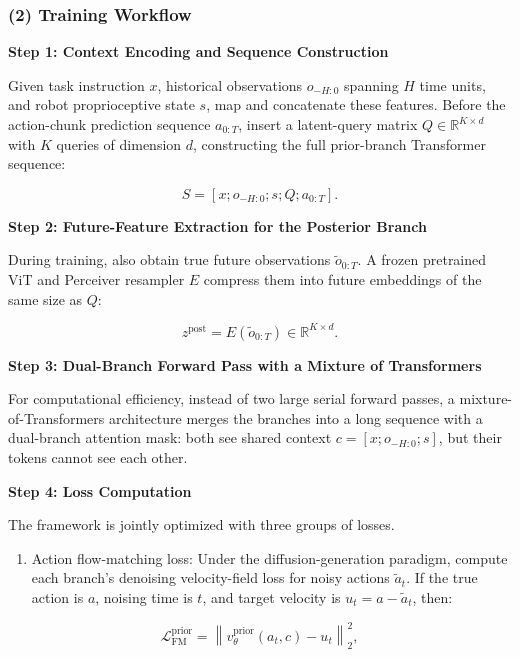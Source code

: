 \hypertarget{training-workflow-3}{%
\subsubsection{(2) Training Workflow}\label{training-workflow-3}}

\textbf{Step 1: Context Encoding and Sequence Construction}

Given task instruction \(x\), historical observations \(o_{-H:0}\) spanning \(H\) time units, and robot proprioceptive state \(s\), map and concatenate these features. Before the action-chunk prediction sequence \(a_{0:T}\), insert a latent-query matrix \(Q\in\mathbb{R}^{K\times d}\) with \(K\) queries of dimension \(d\), constructing the full prior-branch Transformer sequence:

\[
S=[x;o_{-H:0};s;Q;a_{0:T}].
\]

\textbf{Step 2: Future-Feature Extraction for the Posterior Branch}

During training, also obtain true future observations \(\tilde{o}_{0:T}\). A frozen pretrained ViT and Perceiver resampler \(E\) compress them into future embeddings of the same size as \(Q\):

\[
z^{\mathrm{post}}=E(\tilde{o}_{0:T})\in\mathbb{R}^{K\times d}.
\]

\textbf{Step 3: Dual-Branch Forward Pass with a Mixture of Transformers}

For computational efficiency, instead of two large serial forward passes, a mixture-of-Transformers architecture merges the branches into a long sequence with a dual-branch attention mask: both see shared context \(c=[x;o_{-H:0};s]\), but their tokens cannot see each other.

\textbf{Step 4: Loss Computation}

The framework is jointly optimized with three groups of losses.

\begin{enumerate}
\def\labelenumi{\arabic{enumi}.}
\tightlist
\item
  Action flow-matching loss: Under the diffusion-generation paradigm, compute each branch's denoising velocity-field loss for noisy actions \(\tilde a_t\). If the true action is \(a\), noising time is \(t\), and target velocity is \(u_t=a-\tilde a_t\), then:
\end{enumerate}

\[
\mathcal{L}_{\mathrm{FM}}^{\mathrm{prior}}=\left\|v_\theta^{\mathrm{prior}}(a_t,c)-u_t\right\|_2^2,
\]

